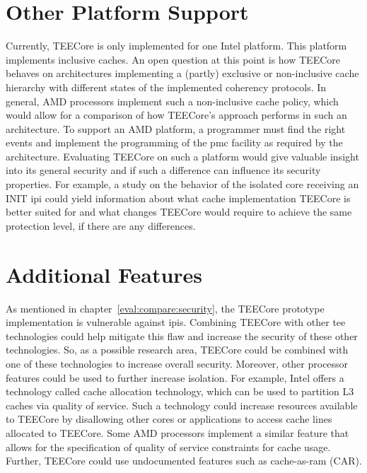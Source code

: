 \section{Other Platform Support}
Currently, TEECore is only implemented for one Intel platform. This platform
implements inclusive caches. An open question at this point is how TEECore
behaves on architectures implementing a (partly) exclusive or non-inclusive
cache hierarchy with different states of the implemented coherency protocols.
In general, AMD processors implement such a non-inclusive cache policy, which
would allow for a comparison of how TEECore's approach performs in such an
architecture. To support an AMD platform, a programmer must find the right
events and implement the programming of the \gls{pmc} facility as required by
the architecture. Evaluating TEECore on such a platform would give valuable
insight into its general security and if such a difference can influence its
security properties. For example, a study on the behavior of the isolated core
receiving an INIT \gls{ipi} could yield information about what cache
implementation TEECore is better suited for and what changes TEECore would
require to achieve the same protection level, if there are any differences.

\section{Additional Features}
As mentioned in chapter~\ref{eval:compare:security}, the TEECore prototype
implementation is vulnerable against \glspl{ipi}. Combining
TEECore with other \gls{tee} technologies could help mitigate this flaw and
increase the security of these other technologies. So, as a possible research
area, TEECore could be combined with one of these technologies to increase
overall security. Moreover, other processor features could be used to further
increase isolation. For example, Intel offers a technology called cache
allocation technology, which can be used to partition L3 caches via quality of
service. Such a technology could increase resources available to TEECore by
disallowing other cores or applications to access cache lines allocated to
TEECore. Some AMD processors implement a similar feature that allows for the
specification of quality of service constraints for cache usage. Further,
TEECore could use undocumented features such as cache-as-ram (CAR).

